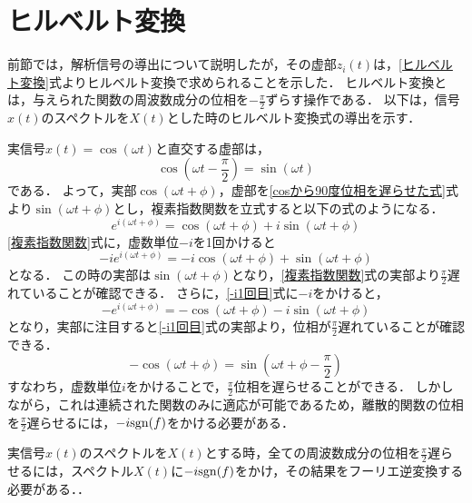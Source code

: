 \section{ヒルベルト変換}
前節では，解析信号の導出について説明したが，その虚部$z_{i}(t)$は，\ref{ヒルベルト変換}式よりヒルベルト変換で求められることを示した．
ヒルベルト変換とは，与えられた関数の周波数成分の位相を$-\frac{\pi}{2}$ずらす操作である．
以下は，信号$x(t)$のスペクトルを$X(t)$とした時のヒルベルト変換式の導出を示す．

実信号$x(t) =\cos (\omega t)$と直交する虚部は，
\begin{equation}
    \label{cosから90度位相を遅らせた式}
    \cos (\omega t - \frac{\pi}{2}) =\sin (\omega t)
\end{equation}
である．
%
よって，実部$\cos (\omega t + \phi)$，虚部を\ref{cosから90度位相を遅らせた式}式より$\sin (\omega t + \phi)$とし，複素指数関数を立式すると以下の式のようになる．
\begin{equation}
    \label{複素指数関数}
    e^{i(\omega t + \phi)} = \cos (\omega t + \phi) + i \sin(\omega t + \phi)
\end{equation}
\ref{複素指数関数}式に，虚数単位$-i$を1回かけると
\begin{equation}
    \label{-i1回目}
    -i e^{i(\omega t + \phi)} = -i \cos (\omega t + \phi) + \sin(\omega t + \phi)
\end{equation}
となる．
この時の実部は$\sin(\omega t + \phi)$となり，\ref{複素指数関数}式の実部より$\frac{\pi}{2}$遅れていることが確認できる．
%
さらに，\ref{-i1回目}式に$-i$をかけると，
\begin{equation}
    -e^{i(\omega t + \phi)} = -\cos(\omega t + \phi) - i \sin(\omega t + \phi)
\end{equation}
となり，実部に注目すると\ref{-i1回目}式の実部より，位相が$\frac{\pi}{2}$遅れていることが確認できる．
%
\begin{equation}
    -\cos(\omega t + \phi) = \sin(\omega t + \phi - \frac{\pi}{2})
\end{equation}
%
すなわち，虚数単位$i$をかけることで，$\frac{\pi}{2}$位相を遅らせることができる．
しかしながら，これは連続された関数のみに適応が可能であるため，離散的関数の位相を$\frac{\pi}{2}$遅らせるには，$-i {\rm{sgn}}(f)$をかける必要がある．
%

実信号$x(t)$のスペクトルを$X(t)$とする時，全ての周波数成分の位相を$\frac{\pi}{2}$遅らせるには，スペクトル$X(t)$に$-i {\rm{sgn}} (f)$をかけ，その結果をフーリエ逆変換する必要がある．．
%